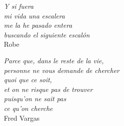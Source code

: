 \thispagestyle{empty}

\vspace*{\fill}
\begin{flushleft}
\textit{Y si fuera \\
mi vida una escalera \\
me la he pasado entera \\
buscando el siguiente escal\'on} \\
\vspace{0.05in}
Robe
\end{flushleft}

\vspace*{\fill}
\begin{flushright}
\textit{Parce que, dans le reste de la vie, \\
personne ne vous demande de chercher \\
quoi que ce soit,\\
et on ne risque pas de trouver\\
puisqu'on ne sait pas \\
ce qu'on cherche} \\
\vspace{0.05in}
Fred Vargas
\end{flushright}
\vspace*{\fill}




